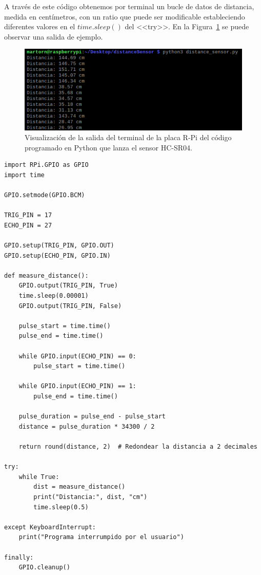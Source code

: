 A través de este código obtenemos por terminal un bucle de datos de distancia, medida en centímetros, con un ratio que puede ser modificable estableciendo diferentes valores en el $time.sleep()$ del <<try>>. En la Figura~\ref{fig:salidaUltrasonidoP} se puede observar una salida de ejemplo. 

\begin{figure}[h]
\centering
\includegraphics[scale=0.8]{images/salidaUltrasonidoPython.png}
\caption[Salida terminal del código Python del sensor HC-SR04]{Visualización de la salida del terminal de la placa R-Pi del código programado en Python que lanza el sensor HC-SR04.}%
\label{fig:salidaUltrasonidoP}
\end{figure}

\lstset{language=Python, breaklines=true, basicstyle=\footnotesize}
\begin{lstlisting}[frame=single]
import RPi.GPIO as GPIO
import time

GPIO.setmode(GPIO.BCM)

TRIG_PIN = 17
ECHO_PIN = 27

GPIO.setup(TRIG_PIN, GPIO.OUT)
GPIO.setup(ECHO_PIN, GPIO.IN)

def measure_distance():
    GPIO.output(TRIG_PIN, True)
    time.sleep(0.00001)
    GPIO.output(TRIG_PIN, False)

    pulse_start = time.time()
    pulse_end = time.time()
    
    while GPIO.input(ECHO_PIN) == 0:
        pulse_start = time.time()

    while GPIO.input(ECHO_PIN) == 1:
        pulse_end = time.time()

    pulse_duration = pulse_end - pulse_start
    distance = pulse_duration * 34300 / 2

    return round(distance, 2)  # Redondear la distancia a 2 decimales

try:
    while True:
        dist = measure_distance()
        print("Distancia:", dist, "cm")
        time.sleep(0.5)

except KeyboardInterrupt:
    print("Programa interrumpido por el usuario")

finally:
    GPIO.cleanup()
\end{lstlisting}

